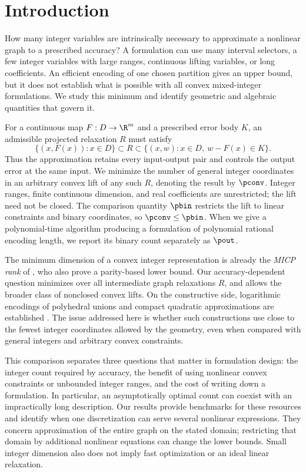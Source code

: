 \section{Introduction}\label{sec:introduction}

How many integer variables are intrinsically necessary to approximate a
nonlinear graph to a prescribed accuracy? A formulation can use many
interval selectors, a few integer variables with large ranges, continuous
lifting variables, or long coefficients. An efficient encoding of one
chosen partition gives an upper bound, but it does not establish what is
possible with all convex mixed-integer formulations. We study this minimum
and identify geometric and algebraic quantities that govern it.

For a continuous map $F:D\to\R^m$ and a prescribed error body $K$, an
admissible projected relaxation $R$ must satisfy
\[
 \{(x,F(x)):x\in D\}\subset R
 \subset\{(x,w):x\in D,\ w-F(x)\in K\}.
\]
Thus the approximation retains every input-output pair and controls the
output error at the same input. We minimize the number of general integer
coordinates in an arbitrary convex lift of any such $R$, denoting the
result by $\pconv$. Integer ranges, finite continuous dimension, and real
coefficients are unrestricted; the lift need not be closed. The comparison
quantity $\pbin$ restricts the lift to linear constraints and binary
coordinates, so $\pconv\le\pbin$. When we give a polynomial-time algorithm
producing a formulation of polynomial rational encoding length, we report
its binary count separately as $\pout$.

The minimum dimension of a convex integer representation is already the
\emph{MICP rank} of \citet[Definition 4.3]{lubin2022}, who also prove a
parity-based lower bound. Our accuracy-dependent question minimizes over
all intermediate graph relaxations $R$, and allows the broader class of
nonclosed convex lifts. On the constructive side, logarithmic encodings
of polyhedral unions and compact quadratic approximations are established
\citep{vielma2018,beach2022}. The issue addressed here is whether such
constructions use close to the fewest integer coordinates allowed by the
geometry, even when compared with general integers and arbitrary convex
constraints.

This comparison separates three questions that matter in formulation
design: the integer count required by accuracy, the benefit of using
nonlinear convex constraints or unbounded integer ranges, and the cost of
writing down a formulation. In particular, an asymptotically optimal count
can coexist with an impractically long description. Our results provide
benchmarks for these resources and identify when one discretization can
serve several nonlinear expressions. They concern approximation of the
entire graph on the stated domain; restricting that domain by additional
nonlinear equations can change the lower bounds. Small integer dimension
also does not imply fast optimization or an ideal linear relaxation.

